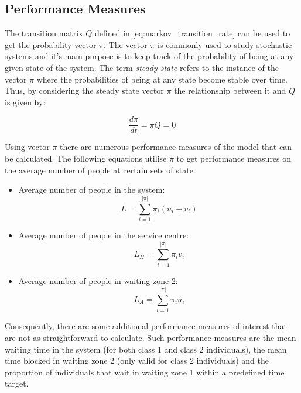 \subsection{Performance Measures}


The transition matrix \( Q \) defined in \ref{eq:markov_transition_rate} can be 
used to get the probability vector \( \pi \).
The vector \( \pi \) is commonly used to study stochastic systems and it's main
purpose is to keep track of the probability of being at any given state of 
the system.
The term \textit{steady state} refers to the instance of the vector \( \pi \) 
where the probabilities of being at any state become stable over time. 
Thus, by considering the steady state vector \( \pi \) the relationship between 
it and \( Q \) is given by:

\[
    \frac{d\pi}{dt} = \pi Q = 0
\]

Using vector \(\pi\) there are numerous performance measures of the model that 
can be calculated. 
The following equations utilise \(\pi\) to get performance measures on the 
average number of people at certain sets of state.

\begin{itemize}
    \item Average number of people in the system: 
        \[L = \sum_{i=1}^{|\pi|} \pi_i (u_i + v_i)\]
    \item Average number of people in the service centre: 
        \[L_H = \sum_{i=1}^{|\pi|} \pi_i v_i\]
    \item Average number of people in waiting zone 2:
        \[L_A = \sum_{i=1}^{|\pi|} \pi_i u_i\] 
\end{itemize}

Consequently, there are some additional performance measures of interest that
are not as straightforward to calculate.
Such performance measures are the mean waiting time in the system (for both 
class 1 and class 2 individuals), the mean time blocked in waiting zone 2 (only 
valid for class 2 individuals) and the proportion of individuals that wait in 
waiting zone 1 within a predefined time target.





